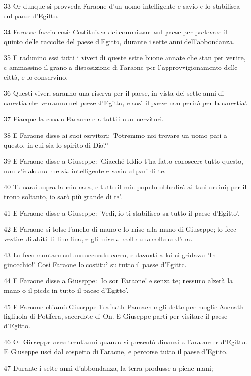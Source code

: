 \par 33 Or dunque si provveda Faraone d'un uomo intelligente e savio e lo stabilisca sul paese d'Egitto.
\par 34 Faraone faccia così: Costituisca dei commissari sul paese per prelevare il quinto delle raccolte del paese d'Egitto, durante i sette anni dell'abbondanza.
\par 35 E radunino essi tutti i viveri di queste sette buone annate che stan per venire, e ammassino il grano a disposizione di Faraone per l'approvvigionamento delle città, e lo conservino.
\par 36 Questi viveri saranno una riserva per il paese, in vista dei sette anni di carestia che verranno nel paese d'Egitto; e così il paese non perirà per la carestia'.
\par 37 Piacque la cosa a Faraone e a tutti i suoi servitori.
\par 38 E Faraone disse ai suoi servitori: 'Potremmo noi trovare un uomo pari a questo, in cui sia lo spirito di Dio?'
\par 39 E Faraone disse a Giuseppe: 'Giacché Iddio t'ha fatto conoscere tutto questo, non v'è alcuno che sia intelligente e savio al pari di te.
\par 40 Tu sarai sopra la mia casa, e tutto il mio popolo obbedirà ai tuoi ordini; per il trono soltanto, io sarò più grande di te'.
\par 41 E Faraone disse a Giuseppe: 'Vedi, io ti stabilisco su tutto il paese d'Egitto'.
\par 42 E Faraone si tolse l'anello di mano e lo mise alla mano di Giuseppe; lo fece vestire di abiti di lino fino, e gli mise al collo una collana d'oro.
\par 43 Lo fece montare sul suo secondo carro, e davanti a lui si gridava: 'In ginocchio!' Così Faraone lo costituì su tutto il paese d'Egitto.
\par 44 E Faraone disse a Giuseppe: 'Io son Faraone! e senza te; nessuno alzerà la mano o il piede in tutto il paese d'Egitto'.
\par 45 E Faraone chiamò Giuseppe Tsafnath-Paneach e gli dette per moglie Asenath figliuola di Potifera, sacerdote di On. E Giuseppe partì per visitare il paese d'Egitto.
\par 46 Or Giuseppe avea trent'anni quando si presentò dinanzi a Faraone re d'Egitto. E Giuseppe uscì dal cospetto di Faraone, e percorse tutto il paese d'Egitto.
\par 47 Durante i sette anni d'abbondanza, la terra produsse a piene mani;
